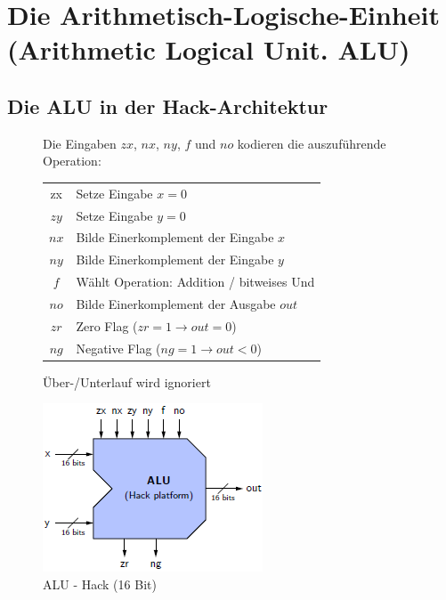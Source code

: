 \documentclass[12pt]{report}
\begin{document}
\section{Die Arithmetisch-Logische-Einheit (Arithmetic Logical Unit. ALU)}
\subsection{Die ALU in der Hack-Architektur}
\begin{figure}[H]
  \begin{minipage}[t]{0.5\textwidth}
    Die Eingaben $zx$, $nx$, $ny$, $f$ und $no$ kodieren die auszuführende Operation:

    \begin{table}[H]
      \begin{tabular}{Cl}
        zx   & Setze Eingabe $x=0$                        \\
        $zy$ & Setze Eingabe $y=0$                        \\
        $nx$ & Bilde Einerkomplement der Eingabe $x$      \\
        $ny$ & Bilde Einerkomplement der Eingabe $y$      \\
        $f$  & Wählt Operation: Addition / bitweises Und  \\
        $no$ & Bilde Einerkomplement der Ausgabe $out$    \\
        $zr$ & Zero Flag ($zr=1 \rightarrow out = 0$)     \\
        $ng$ & Negative Flag ($ng=1 \rightarrow out < 0$)
      \end{tabular}
    \end{table}

    Über-/Unterlauf wird ignoriert
  \end{minipage}
  \hfill
  \begin{minipage}[t]{0.4\textwidth}
    \caption{ALU - Hack (16 Bit)}
    \label{fig:alu_der_hack-platform}
    \centering
    \includegraphics[width=\textwidth]{alu_der_hack-platform}
  \end{minipage}
\end{figure}
\end{document}
